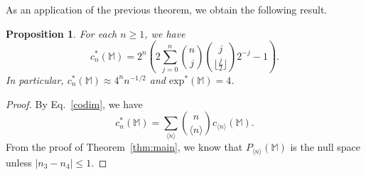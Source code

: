 \documentclass[11pt]{amsart}
\newtheorem{proposition}[theorem]{Proposition}
\theoremstyle{definition}
\theoremstyle{remark}
\begin{document}
	As an application of the previous theorem, we obtain the following result.
	
	
	
	\begin{proposition}\label{prop:cod}
		For each $n\ge 1$, we have 
		\begin{equation}\label{eq:binom}
			c_n^*(\mathbb M)=2^{n}\left(2\sum_{j=0}^{n}\binom{n}{j}\binom{j}{\lfloor\frac{j}{2}\rfloor}2^{-j}-1\right).
		\end{equation}
		In particular, $c_n^*(\mathbb M)\approx 4^nn^{-1/2}$ and $\mathrm{exp}^*(\mathbb M)=4$.
	\end{proposition}
	
	\begin{proof}
		
		By Eq.~\eqref{codim}, we have  $$c_n^*(\mathbb M)=\displaystyle \sum_{\langle n\rangle}\binom{n}{{\langle n\rangle}}c_{\langle n\rangle}(\mathbb M).$$
		From the proof of Theorem~\ref{thm:main}, we know that $P_{\langle n\rangle}(\mathbb M)$ is the null space unless $|n_3-n_4|\le 1$. 
		

\end{proof}
\end{document}
